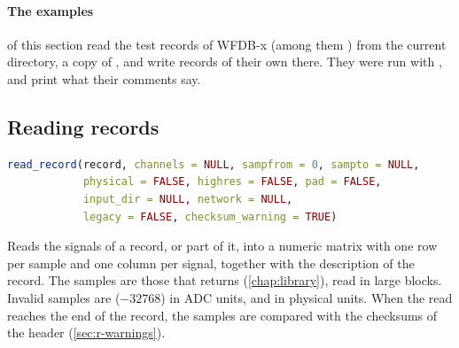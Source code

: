 \paragraph{The examples} of this section read the test records of WFDB-x (among them
) from the current directory, a copy of , and write records of
their own there. They were run with , and print what their comments say.

\subsection{Reading records}
\label{sec:r-reading}

\begin{lstlisting}[language=R,style=signature]
read_record(record, channels = NULL, sampfrom = 0, sampto = NULL,
            physical = FALSE, highres = FALSE, pad = FALSE,
            input_dir = NULL, network = NULL,
            legacy = FALSE, checksum_warning = TRUE)
\end{lstlisting}
Reads the signals of a record, or part of it, into a numeric matrix with one row per
sample and one column per signal, together with the description of the record. The
samples are those that  returns (\cref{chap:library}), read in large blocks.
Invalid samples are  ($-32768$) in ADC units, and 
in physical units. When the read reaches the end of the record, the samples are compared
with the checksums of the header (\cref{sec:r-warnings}).
